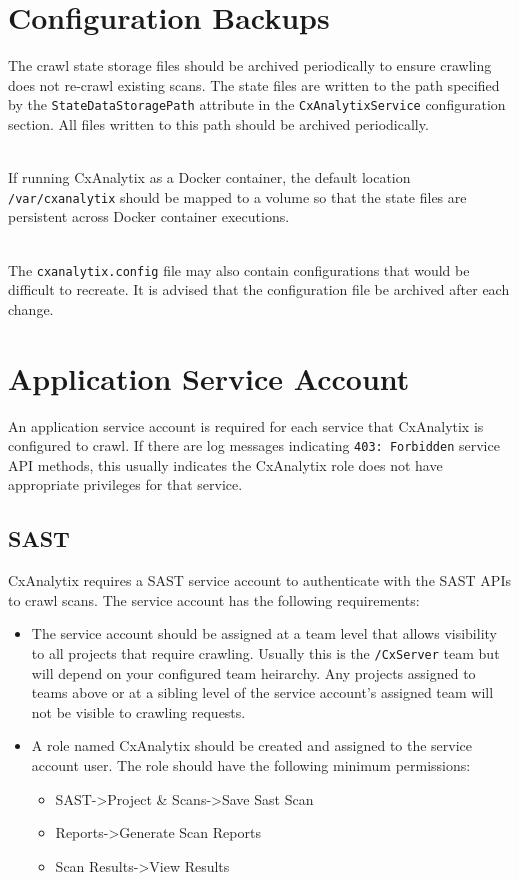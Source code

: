 \section{Configuration Backups}
The crawl state storage files should be archived periodically to ensure crawling does not re-crawl existing scans. The state files are written to the path 
specified by the \verb|StateDataStoragePath| attribute in the \verb|CxAnalytixService| configuration section.  All files written to this path should
be archived periodically.

\noindent\\If running CxAnalytix as a Docker container, the default location \verb|/var/cxanalytix| should be mapped to a volume so that the state files are persistent across 
Docker container executions.  

\noindent\\The \verb|cxanalytix.config| file may also contain configurations that would be difficult to recreate.  It is advised that the configuration file be archived
after each change.

\section{Application Service Account}

An application service account is required for each service that CxAnalytix is configured to crawl.  If there are log messages indicating 
\verb|403: Forbidden| service API methods, this usually indicates the CxAnalytix role does not have appropriate privileges for that service.


\subsection{SAST}
CxAnalytix requires a SAST service account to authenticate with the SAST APIs to crawl scans. The service account has the following requirements:

\begin{itemize}
    \item The service account should be assigned at a team level that allows visibility to all projects that require crawling. 
    Usually this is the \verb|/CxServer|
    team but will depend on your configured team heirarchy. Any projects assigned to teams above or at a sibling level of the service account's assigned team 
    will not be visible to crawling requests.

    \item A role named CxAnalytix should be created and assigned to the service account user. The role should have the following minimum permissions:
    \begin{itemize}
        \item SAST->Project \& Scans->Save Sast Scan
        \item Reports->Generate Scan Reports
        \item Scan Results->View Results
    \end{itemize}

\end{itemize}

